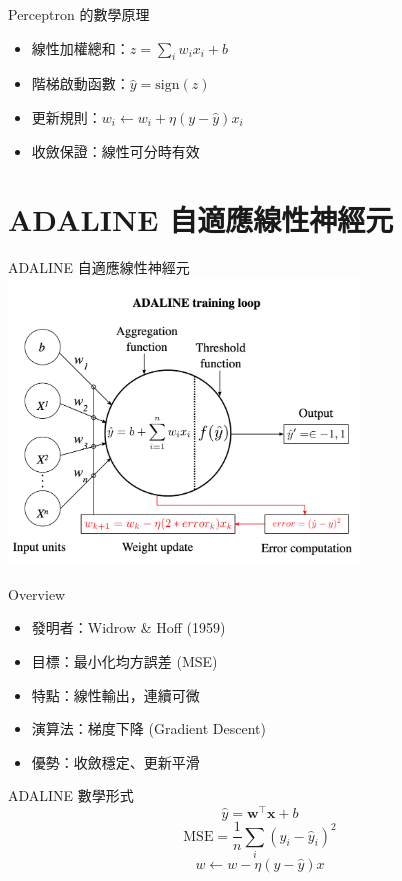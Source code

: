 \documentclass{beamer}
\begin{document}
\begin{frame}{Perceptron 的數學原理}
  \begin{itemize}
    \item 線性加權總和：$z=\sum_i w_i x_i + b$
    \item 階梯啟動函數：$\hat y=\mathrm{sign}(z)$
    \item 更新規則：$w_i\leftarrow w_i+\eta(y-\hat y)x_i$
    \item 收斂保證：線性可分時有效
  \end{itemize}
\end{frame}

\section{ADALINE 自適應線性神經元}
\begin{frame}{ADALINE 自適應線性神經元}
  \centering
  \includegraphics[width=0.7\textwidth]{ADALINE_picture.png}
\end{frame}

\begin{frame}{Overview}
  \begin{itemize}
    \item 發明者：Widrow \& Hoff (1959)
    \item 目標：最小化均方誤差 (MSE)
    \item 特點：線性輸出，連續可微
    \item 演算法：梯度下降 (Gradient Descent)
    \item 優勢：收斂穩定、更新平滑
  \end{itemize}
\end{frame}

\begin{frame}{ADALINE 數學形式}
  \[
    \hat y=\mathbf{w}^\top\mathbf{x}+b
  \]
  \[
    \mathrm{MSE}=\frac1n\sum_i(y_i-\hat y_i)^2
  \]
  \[
    w\leftarrow w-\eta(y-\hat y)x
  \]
\end{frame}
\end{document}
